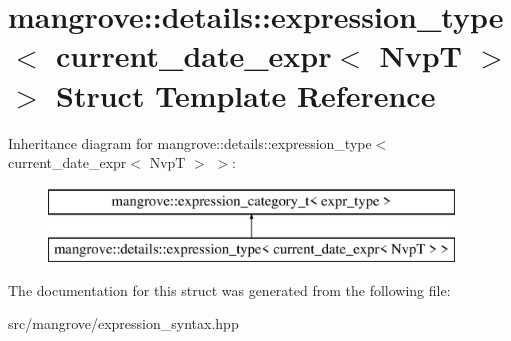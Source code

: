 \hypertarget{structmangrove_1_1details_1_1expression__type_3_01current__date__expr_3_01NvpT_01_4_01_4}{}\section{mangrove\+:\+:details\+:\+:expression\+\_\+type$<$ current\+\_\+date\+\_\+expr$<$ NvpT $>$ $>$ Struct Template Reference}
\label{structmangrove_1_1details_1_1expression__type_3_01current__date__expr_3_01NvpT_01_4_01_4}
Inheritance diagram for mangrove\+:\+:details\+:\+:expression\+\_\+type$<$ current\+\_\+date\+\_\+expr$<$ NvpT $>$ $>$\+:\begin{figure}[H]
\begin{center}
\leavevmode
\includegraphics[height=2.000000cm]{structmangrove_1_1details_1_1expression__type_3_01current__date__expr_3_01NvpT_01_4_01_4}
\end{center}
\end{figure}


The documentation for this struct was generated from the following file\+:\begin{DoxyCompactItemize}
\item 
src/mangrove/expression\+\_\+syntax.\+hpp\end{DoxyCompactItemize}
